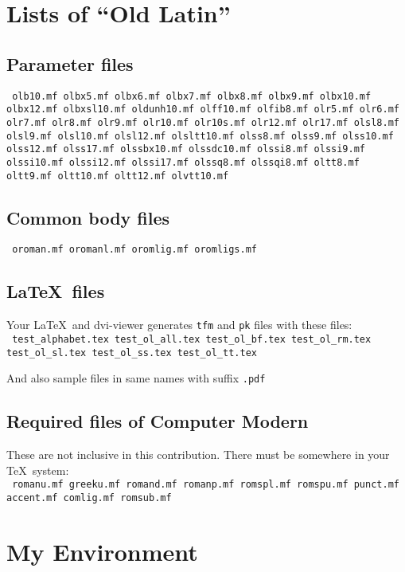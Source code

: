 \documentclass[a4paper]{article}
\begin{document}
\section{Lists of ``Old Latin''}

\subsection{Parameter files}

\texttt{%
olb10.mf
olbx5.mf olbx6.mf olbx7.mf olbx8.mf olbx9.mf olbx10.mf olbx12.mf
olbxsl10.mf
oldunh10.mf
olff10.mf
olfib8.mf
olr5.mf olr6.mf olr7.mf olr8.mf olr9.mf olr10.mf olr10s.mf olr12.mf olr17.mf
olsl8.mf olsl9.mf olsl10.mf olsl12.mf
olsltt10.mf
olss8.mf olss9.mf olss10.mf olss12.mf olss17.mf
olssbx10.mf
olssdc10.mf
olssi8.mf olssi9.mf olssi10.mf olssi12.mf olssi17.mf
olssq8.mf olssqi8.mf
oltt8.mf oltt9.mf oltt10.mf oltt12.mf
olvtt10.mf
}

\subsection{Common body files}

\texttt{%
oroman.mf
oromanl.mf
oromlig.mf
oromligs.mf
}

\subsection{\LaTeX\ files}
Your \LaTeX\ and dvi-viewer generates \texttt{tfm} and \texttt{pk} files
with these files:\\
\texttt{%
test\_alphabet.tex
test\_ol\_all.tex
test\_ol\_bf.tex
test\_ol\_rm.tex
test\_ol\_sl.tex
test\_ol\_ss.tex
test\_ol\_tt.tex
}

And also sample files in same names with suffix \texttt{.pdf}

\subsection{Required files of Computer Modern}

These are not inclusive in this contribution.
There must be somewhere in your \TeX\ system:\\
\texttt{%
romanu.mf
greeku.mf
romand.mf
romanp.mf
romspl.mf
romspu.mf
punct.mf
accent.mf
comlig.mf
romsub.mf
}

\section{My Environment}
\end{document}
